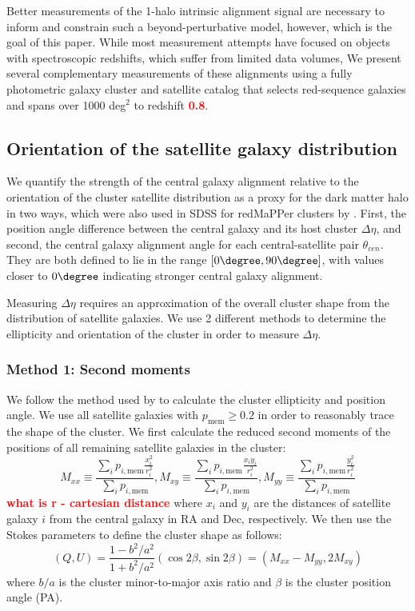 \documentclass[fleqn,usenatbib]{mnras}
\newcommand{\verify}[1]{\textcolor{red}{\textbf{{#1}}}}
\begin{document}
Better measurements of the 1-halo intrinsic alignment signal are necessary to inform and constrain such a beyond-perturbative model, however, which is the goal of this paper. While most measurement attempts have focused on objects with spectroscopic redshifts, which suffer from limited data volumes, We present several complementary measurements of these alignments using a fully photometric galaxy cluster and satellite catalog that selects red-sequence galaxies and spans over 1000 deg$^2$ to redshift \verify{0.8}.

\subsection{Orientation of the satellite galaxy distribution}\label{pamethod}

We quantify the strength of the central galaxy alignment relative to the orientation of the cluster satellite distribution as a proxy for the dark matter halo in two ways, which were also used in SDSS for redMaPPer clusters by \cite{Huang_2016}. First, the position angle difference between the central galaxy and its host cluster $\Delta \eta$, and second, the central galaxy alignment angle for each central-satellite pair $\theta _{cen}$. They are both defined to lie in the range $[0 \degree , 90 \degree]$, with values closer to $0 \degree$ indicating stronger central galaxy alignment.

Measuring $\Delta \eta$ requires an approximation of the overall cluster shape from the distribution of satellite galaxies. We use 2 different methods to determine the ellipticity and orientation of the cluster in order to measure $\Delta \eta$.

\subsubsection{Method 1: Second moments}

We follow the method used by \citet{Huang_2016} to calculate the cluster ellipticity and position angle. We use all satellite galaxies with $p_{\mathrm{mem}} \geq 0.2$ in order to reasonably trace the shape of the cluster. We first calculate the reduced second moments of the positions of all remaining satellite galaxies in the cluster:
\begin{equation}
    M_{xx} \equiv \frac{\sum_i p_{i,\mathrm{mem}} \frac{x_i^2}{r_i^2}}{\sum_i p_{i,\mathrm{mem}}}, M_{xy} \equiv \frac{\sum_i p_{i,\mathrm{mem}} \frac{x_i y_i}{r_i^2}}{\sum_i p_{i,\mathrm{mem}}}, M_{yy} \equiv \frac{\sum_i p_{i,\mathrm{mem}} \frac{y_i^2}{r_i^2}}{\sum_i p_{i,\mathrm{mem}}}
\end{equation}
\verify{what is r - cartesian distance}
where $x_i$ and $y_i$ are the distances of satellite galaxy $i$ from the central galaxy in RA and Dec, respectively. We then use the Stokes parameters to define the cluster shape as follows:
\begin{equation}
    (Q, U) = \frac{1-b^2/a^2}{1+b^2/a^2} (\cos 2\beta, \sin 2\beta) = (M_{xx} - M_{yy}, 2M_{xy})
\end{equation}
where $b/a$ is the cluster minor-to-major axis ratio and $\beta$ is the cluster position angle (PA).
\end{document}
